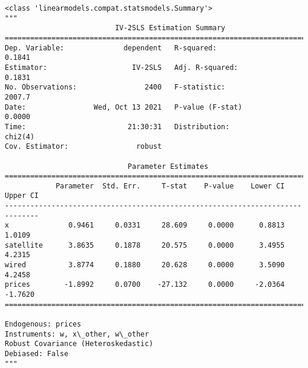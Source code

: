             \begin{tcolorbox}[breakable, size=fbox, boxrule=.5pt, pad at break*=1mm, opacityfill=0]
\begin{Verbatim}[commandchars=\\\{\}]
<class 'linearmodels.compat.statsmodels.Summary'>
"""
                          IV-2SLS Estimation Summary
==============================================================================
Dep. Variable:              dependent   R-squared:                      0.1841
Estimator:                    IV-2SLS   Adj. R-squared:                 0.1831
No. Observations:                2400   F-statistic:                    2007.7
Date:                Wed, Oct 13 2021   P-value (F-stat)                0.0000
Time:                        21:30:31   Distribution:                  chi2(4)
Cov. Estimator:                robust

                             Parameter Estimates
==============================================================================
            Parameter  Std. Err.     T-stat    P-value    Lower CI    Upper CI
------------------------------------------------------------------------------
x              0.9461     0.0331     28.609     0.0000      0.8813      1.0109
satellite      3.8635     0.1878     20.575     0.0000      3.4955      4.2315
wired          3.8774     0.1880     20.628     0.0000      3.5090      4.2458
prices        -1.8992     0.0700    -27.132     0.0000     -2.0364     -1.7620
==============================================================================

Endogenous: prices
Instruments: w, x\_other, w\_other
Robust Covariance (Heteroskedastic)
Debiased: False
"""
\end{Verbatim}
\end{tcolorbox}

